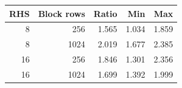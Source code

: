 \begin{tabular}{rrrrr}
\toprule
RHS & Block rows & Ratio & Min & Max \\
\midrule
8 & 256 & 1.565 & 1.034 & 1.859 \\
8 & 1024 & 2.019 & 1.677 & 2.385 \\
16 & 256 & 1.846 & 1.301 & 2.356 \\
16 & 1024 & 1.699 & 1.392 & 1.999 \\
\bottomrule
\end{tabular}
